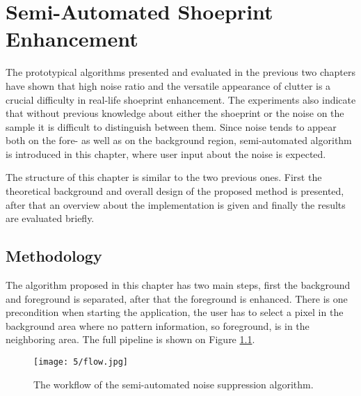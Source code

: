 \documentclass[draft,final]{vutinfth} %
\begin{document}
\chapter{Semi-Automated Shoeprint Enhancement}
\par
The prototypical algorithms presented and evaluated in the previous two chapters have shown that high noise ratio and the versatile appearance of clutter is a crucial difficulty in real-life shoeprint enhancement.
The experiments also indicate that without previous knowledge about either the shoeprint or the noise on the sample it is difficult to distinguish between them.
Since noise tends to appear both on the fore- as well as on the background region, semi-automated algorithm is introduced in this chapter, where user input about the noise is expected.
\par
The structure of this chapter is similar to the two previous ones.
First the theoretical background and overall design of the proposed method is presented, after that an overview about the implementation is given and finally the results are evaluated briefly.

\section{Methodology}
\par
The algorithm proposed in this chapter has two main steps, first the background and foreground is separated, after that the foreground is enhanced.
There is one precondition when starting the application, the user has to select a pixel in the background area where no pattern information, so foreground, is in the neighboring area.
The full pipeline is shown on Figure \ref{fig:sans:workflow}.

\begin{figure}[h]
  \centering
  \texttt{[image: 5/flow.jpg]}
  \caption{The workflow of the semi-automated noise suppression algorithm.}
  \label{fig:sans:workflow} %
\end{figure}
\end{document}
